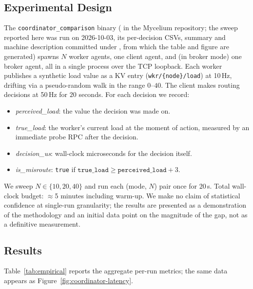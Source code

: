 \documentclass[11pt]{article}
\theoremstyle{definition}
\theoremstyle{plain}
\theoremstyle{plain}
\begin{document}
\subsection{Experimental Design}

The \texttt{coordinator\_comparison} binary
( in the Mycelium repository; the
sweep reported here was run on 2026-10-03, its per-decision CSVs, summary and
machine description committed under ,
from which the table and figure are generated) spawns $N$ worker agents, one client agent,
and (in broker mode) one broker agent, all in a single process over the
TCP loopback. Each worker publishes a synthetic load value as a KV entry
(\texttt{wkr/\{node\}/load}) at 10\,Hz, drifting via a pseudo-random walk
in the range $0$--$40$. The client makes routing decisions at 50\,Hz for
$20$ seconds. For each decision we record:

\begin{itemize}
\item \emph{perceived\_load}: the value the decision was made on.
\item \emph{true\_load}: the worker's current load at the moment of action,
  measured by an immediate probe RPC after the decision.
\item \emph{decision\_us}: wall-clock microseconds for the decision itself.
\item \emph{is\_misroute}: \texttt{true} if
  $\texttt{true\_load} \geq \texttt{perceived\_load} + 3$.
\end{itemize}

We sweep $N \in \{10, 20, 40\}$ and run each (mode, $N$) pair once for
$20$\,s. Total wall-clock budget: $\approx$5 minutes including warm-up.
We make no claim of statistical confidence at single-run granularity; the
results are presented as a demonstration of the methodology and an initial
data point on the magnitude of the gap, not as a definitive measurement.

\subsection{Results}



Table~\ref{tab:empirical} reports the aggregate per-run metrics; the same
data appears as Figure~\ref{fig:coordinator-latency}.
\end{document}
